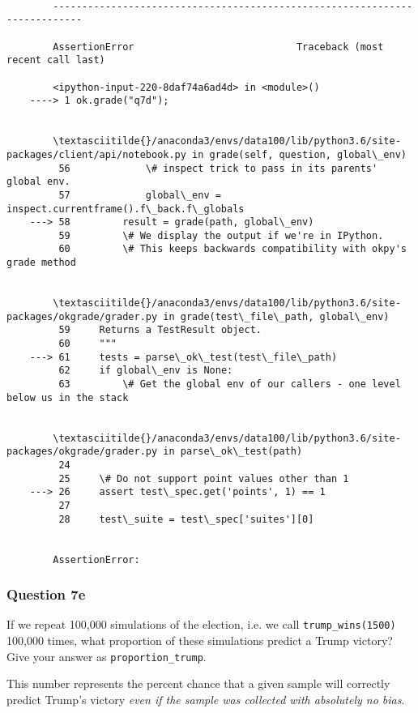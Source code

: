 \documentclass[11pt]{article}
\begin{document}
    \begin{Verbatim}[commandchars=\\\{\}]

        ---------------------------------------------------------------------------

        AssertionError                            Traceback (most recent call last)

        <ipython-input-220-8daf74a6ad4d> in <module>()
    ----> 1 ok.grade("q7d");
    

        \textasciitilde{}/anaconda3/envs/data100/lib/python3.6/site-packages/client/api/notebook.py in grade(self, question, global\_env)
         56             \# inspect trick to pass in its parents' global env.
         57             global\_env = inspect.currentframe().f\_back.f\_globals
    ---> 58         result = grade(path, global\_env)
         59         \# We display the output if we're in IPython.
         60         \# This keeps backwards compatibility with okpy's grade method


        \textasciitilde{}/anaconda3/envs/data100/lib/python3.6/site-packages/okgrade/grader.py in grade(test\_file\_path, global\_env)
         59     Returns a TestResult object.
         60     """
    ---> 61     tests = parse\_ok\_test(test\_file\_path)
         62     if global\_env is None:
         63         \# Get the global env of our callers - one level below us in the stack


        \textasciitilde{}/anaconda3/envs/data100/lib/python3.6/site-packages/okgrade/grader.py in parse\_ok\_test(path)
         24 
         25     \# Do not support point values other than 1
    ---> 26     assert test\_spec.get('points', 1) == 1
         27 
         28     test\_suite = test\_spec['suites'][0]


        AssertionError: 

    \end{Verbatim}

    \subsubsection{Question 7e}\label{question-7e}

If we repeat 100,000 simulations of the election, i.e. we call
\texttt{trump\_wins(1500)} 100,000 times, what proportion of these
simulations predict a Trump victory? Give your answer as
\texttt{proportion\_trump}.

This number represents the percent chance that a given sample will
correctly predict Trump's victory \emph{even if the sample was collected
with absolutely no bias}.
\end{document}
